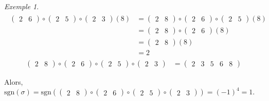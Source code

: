 \documentclass{report}
\theoremstyle{definition}
\theoremstyle{remark}
\newtheorem*{exem}{Exemple}
\begin{document}
\begin{exem}
\begin{align*}
\begin{split}
\begin{pmatrix}
					2&6
				\end{pmatrix} \circ \begin{pmatrix}
					2&5
				\end{pmatrix} \circ \begin{pmatrix}
					2&3
				\end{pmatrix}(8)&= \begin{pmatrix}
					2&8
				\end{pmatrix} \circ \begin{pmatrix}
					2&6
				\end{pmatrix} \circ \begin{pmatrix}
					2&5
				\end{pmatrix}(8)\\
				&= \begin{pmatrix}
					2&8
				\end{pmatrix} \circ \begin{pmatrix}
					2&6
				\end{pmatrix}(8)\\
				&= \begin{pmatrix}
					2&8
				\end{pmatrix}(8)\\
				&= 2
			\end{split}\tag{8}
		\end{align*}
		\begin{align*}
		\begin{pmatrix}
			2&8
		\end{pmatrix} \circ \begin{pmatrix}
			2&6
		\end{pmatrix} \circ \begin{pmatrix}
			2&5
		\end{pmatrix} \circ \begin{pmatrix}
			2&3
		\end{pmatrix}&= \begin{pmatrix}
			2&3&5&6&8
		\end{pmatrix}
		\end{align*}

		Alors, $\mathrm{sgn}(\sigma) = \mathrm{sgn}\left( \begin{pmatrix}
			2&8
		\end{pmatrix} \circ \begin{pmatrix}
			2&6
		\end{pmatrix} \circ \begin{pmatrix}
			2&5
		\end{pmatrix} \circ \begin{pmatrix}
			2&3
		\end{pmatrix} \right) = (-1)^4 = 1$.
	\end{exem}
\end{document}
